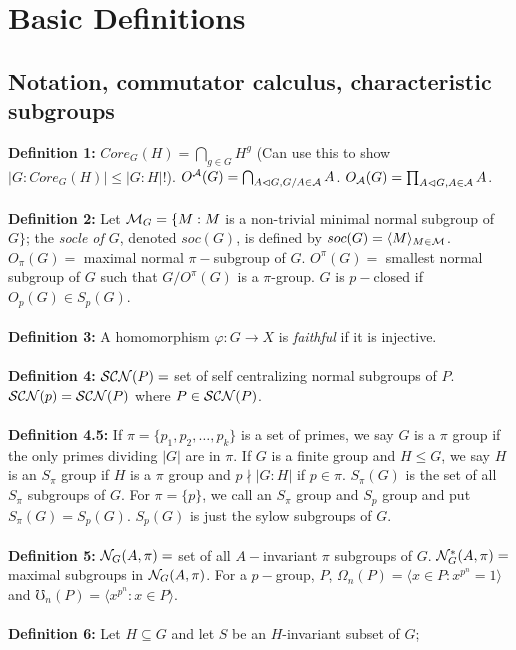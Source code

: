 \chapter{Basic Definitions}
\section{Notation, commutator calculus, characteristic subgroups}
{\bf Definition 1:}
$Core_G(H)= \bigcap_{g \in G} H^g$ (Can use this to show $|G:Core_G(H)|\le |G:H|!$).
$O^{\cal A}(G)= \bigcap_{A \lhd G, G/A \in {\cal A}} A$.
$O_{\cal A}(G)= \prod_{A \lhd G, A \in {\cal A}} A$.\\
\\
{\bf Definition 2:} Let ${\cal M}_G= \{ M: M$ is a non-trivial minimal normal subgroup of $G\}$;
the \emph{socle of $G$}, denoted
$soc(G)$, is defined by
$soc(G)= \langle M \rangle_{M \in {\cal M}}$.
$O_{\pi}(G)=$ maximal normal $\pi-$subgroup of $G$.
$O^{\pi}(G)=$ smallest normal subgroup of $G$ such that $G/O^{\pi}(G)$ is a $\pi$-group.
$G$ is $p-$closed if $O_p(G) \in S_p(G)$.
\\
\\
{\bf Definition 3:}
A homomorphism $\varphi: G \rightarrow X$ is \emph {faithful} if it is injective.
\\
\\
{\bf Definition 4:}
${\cal SCN}(P)=$ set of self centralizing normal subgroups of $P$.
${\cal SCN}(p)= {\cal SCN}(P)$ where $P \in {\cal SCN}(P)$.
\\
\\
{\bf Definition 4.5:} If $\pi = \{ p_1, p_2, \ldots , p_k\}$ is a set of primes, we say
$G$ is a $\pi$ group if the only primes dividing $|G|$ are in $\pi$.  If $G$ is a finite
group and $H \leq G$, we say $H$ is an $S_{\pi}$ group if $H$ is a $\pi$ group and
$p \nmid |G:H|$  if $p \in \pi$.  $S_{\pi}(G)$  is the set of all $S_{\pi}$ subgroups of
$G$. For $\pi = \{ p \}$, we call an $S_{\pi}$ group and $S_p$ group and put $S_{\pi}(G) = S_p(G)$.
$S_p(G)$ is just the sylow subgroups of $G$.
\\
\\
{\bf Definition 5:}
${\cal N}_G(A, \pi)=$ set of all $A-$invariant $\pi$ subgroups of $G$.
${\cal N}_G^*(A, \pi)=$ maximal subgroups in ${\cal N}_G(A, \pi)$.  For a $p-$group, $P$,
$\Omega_n(P)=
\langle x \in P: x^{p^n}=1 \rangle $ and
$\mho_n(P)= \langle x^{p^n}: x \in P \rangle $.
\\
\\
{\bf Definition 6:} Let $H \subseteq G$ and let $S$ be an $H$-invariant subset of $G$;
